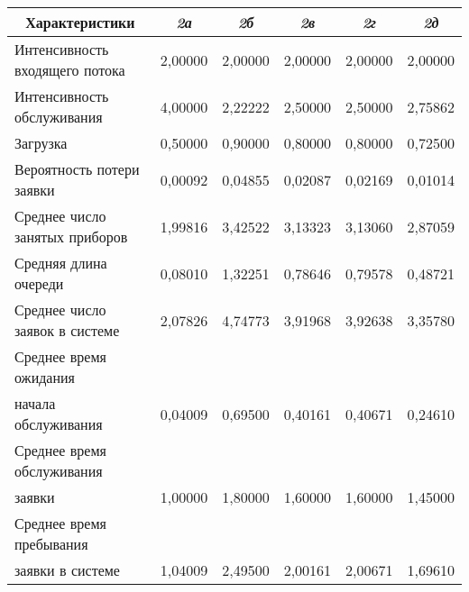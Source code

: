 \begin{multicols}{2}
\begin{table*}
\begin{center}
\begin{tabular}{|l|c|c|c|c|c|}
\hline
\multicolumn{1}{|c|}{Характеристики}    &  \textit{2а}     & \textit{2б} & \textit{2в} & \textit{2г}     & \textit{2д}\\
\hline
Интенсивность входящего потока              & 2,00000 & 2,00000 &  2,00000 & 2,00000 & 2,00000\\
\hline
Интенсивность обслуживания                  & 4,00000 & 2,22222 &  2,50000 & 2,50000 & 2,75862\\
\hline
Загрузка                                    & 0,50000 & 0,90000 &  0,80000 & 0,80000 & 0,72500\\
\hline
Вероятность потери заявки                   & 0,00092 & 0,04855 &  0,02087 & 0,02169 & 0,01014\\
\hline
Среднее число
занятых приборов                            & 1,99816 & 3,42522 &  3,13323 & 3,13060 & 2,87059\\
\hline
Средняя длина очереди                       & 0,08010 & 1,32251 &  0,78646 & 0,79578 & 0,48721\\
\hline
Среднее число заявок в системе              & 2,07826 & 4,74773 &  3,91968 & 3,92638 & 3,35780\\
\hline
Среднее время ожидания  & & & & & \\
начала обслуживания                         & 0,04009 & 0,69500 &  0,40161 & 0,40671 & 0,24610\\
\hline
Среднее время обслуживания & & & & & \\
заявки                                      & 1,00000 & 1,80000 &  1,60000 & 1,60000 & 1,45000\\
\hline
Среднее время пребывания & & & & &  \\
заявки в системе                            & 1,04009 & 2,49500 &  2,00161 & 2,00671 & 1,69610\\
\hline
\end{tabular}
\end{center}
\end{table*}

\begin{figure*} %
\vspace*{1pt}
\begin{center}
\mbox{%
\epsfxsize=162.45mm
}
\end{center}
\vspace*{-9pt}
\end{figure*}


\end{multicols}
